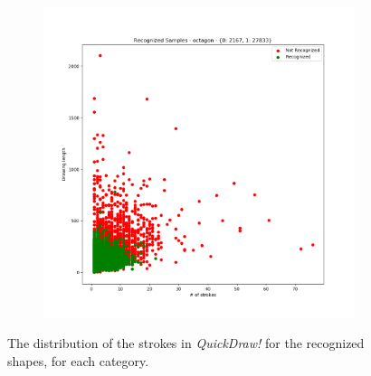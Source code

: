 \begin{figure}
\begin{subfigure}{0.3\textwidth}
    \end{subfigure}
    ~
    \begin{subfigure}{0.3\textwidth}
        \includegraphics[scale=0.28]{images/dataset/recog_octagon.png}
    \end{subfigure}

    \caption{The distribution of the strokes in \textit{QuickDraw!} for the recognized shapes, for each category.}
    \label{fig:recognition}
\end{figure}

